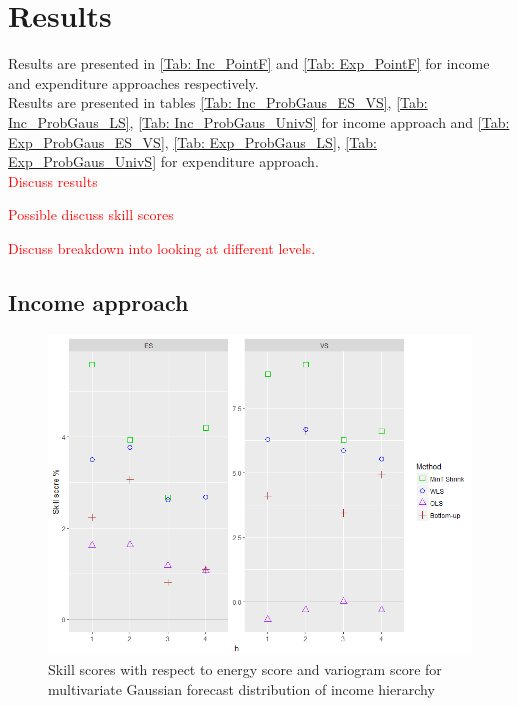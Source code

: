 \documentclass[graybox]{svmult}
\begin{document}
\section{Results}\label{sec:results}

Results are presented in \ref{Tab: Inc_PointF} and \ref{Tab: Exp_PointF} for income and expenditure approaches respectively. \\

Results are presented in tables \ref{Tab: Inc_ProbGaus_ES_VS}, \ref{Tab: Inc_ProbGaus_LS}, \ref{Tab: Inc_ProbGaus_UnivS} for income approach and \ref{Tab: Exp_ProbGaus_ES_VS}, \ref{Tab: Exp_ProbGaus_LS}, \ref{Tab: Exp_ProbGaus_UnivS} for expenditure approach. \\

\textcolor{red}{Discuss results}


\textcolor{red}{Possible discuss skill scores}

\textcolor{red}{Discuss breakdown into looking at different levels.}

\subsection*{Income approach}

\begin{figure}[H]
	\centering
	\small
	\includegraphics[scale=0.50]{Figs/Results/INC-ProbGaussF-MultivS_ES_VS.png}
	\caption{Skill scores with respect to energy score and variogram score for multivariate Gaussian forecast distribution of income hierarchy}\label{Inc_ProbGaus_ES_VS}
\end{figure}
\end{document}
